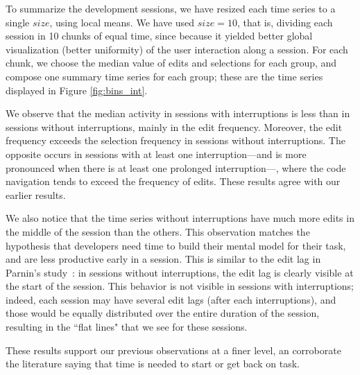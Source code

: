 \documentclass[times]{smrauth}
\begin{document}
To summarize the development sessions, we have resized each time series to a single $size$, using local means. We have used $size = 10$, that is, dividing each session in 10 chunks of equal time, since because it yielded better global visualization (better uniformity) of the user interaction along a session. For each chunk, we choose the median value of edits and selections for each group, and compose one summary time series for each group; these are the time series displayed in Figure \ref{fig:bins_int}.

We observe that the median activity in sessions with interruptions is less than in sessions without interruptions, mainly in the edit frequency. Moreover, the edit frequency exceeds the selection frequency in sessions without interruptions. The opposite occurs in sessions with at least one interruption---and is more pronounced when there is at least one prolonged interruption---, where the code navigation tends to exceed the frequency of edits. These results agree with our earlier results. 

We also notice that the time series without interruptions have much more edits in the middle of the session than the others. This observation matches the hypothesis that developers need time to build their mental model for their task, and are less productive early in a session. This is similar to the edit lag in Parnin's study~\cite{PR11}: in sessions without interruptions, the edit lag is clearly visible at the start of the session. This behavior is not visible in sessions with interruptions; indeed, each session may have several edit lags (after each interruptions), and those would be equally distributed over the entire duration of the session, resulting in the ``flat lines" that we see for these sessions.



These results support our previous observations at a finer level, an corroborate the literature saying that time is needed to start or get back on task.


\end{document}

